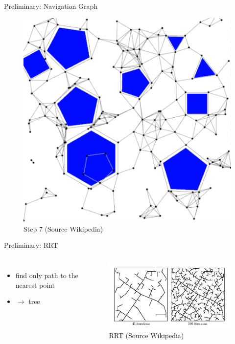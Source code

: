 \documentclass[ignorenonframetext,aspectratio=169,]{paradise-slide}
\providecommand{\tightlist}{%
  \setlength{\itemsep}{0pt}\setlength{\parskip}{0pt}}
\begin{document}
\begin{frame}[fragile]{Preliminary: Navigation Graph}
\protect\hypertarget{preliminary-navigation-graph-6}{}

\begin{figure}
\centering
\includegraphics{PRM-8.png}
\caption{Step 7 (Source Wikipedia)}
\end{figure}

\addtocounter{framenumber}{-1}

\end{frame}

\begin{frame}[fragile]{Preliminary: RRT}
\protect\hypertarget{preliminary-rrt}{}

\begin{columns}


\begin{itemize}
\tightlist
\item
  find only path to the nearest point
\item
  \(\rightarrow\) tree
\end{itemize}


\begin{figure}
\centering
\includegraphics{RRT_graph1.png}
\caption{RRT (Source Wikipedia)}
\end{figure}

\end{columns}

\end{frame}
\end{document}
